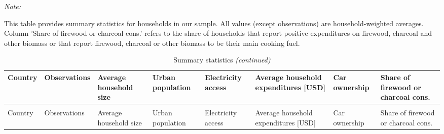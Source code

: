 \begingroup\fontsize{9}{11}\selectfont

\begin{ThreePartTable}
\begin{TableNotes}
\item \textit{Note: } 
\item This table provides summary statistics for households in our sample. All values (except observations) are household-weighted averages. Column 'Share of firewood or charcoal cons.' refers to the share of households that report positive expenditures on firewood, charcoal and other biomass or that report firewood, charcoal or other biomass to be their main cooking fuel.
\end{TableNotes}
\begin{longtable}[t]{>{\raggedright\arraybackslash}p{1.5 cm}|>{\raggedleft\arraybackslash}p{1.5 cm}>{\centering\arraybackslash}p{1.5 cm}>{\centering\arraybackslash}p{1.5 cm}>{\centering\arraybackslash}p{1.5 cm}>{\centering\arraybackslash}p{1.5 cm}>{\centering\arraybackslash}p{1.5 cm}>{\centering\arraybackslash}p{1.5 cm}}
\caption{\label{tab:A1}Summary statistics}\\
\toprule
Country & Observations & Average 
household size & Urban 
population & Electricity 
access & Average 
household 
expenditures [USD] & Car 
ownership & Share of 
firewood or 
 charcoal cons.\\
\midrule
\endfirsthead
\caption[]{Summary statistics \textit{(continued)}}\\
\toprule
Country & Observations & Average 
household size & Urban 
population & Electricity 
access & Average 
household 
expenditures [USD] & Car 
ownership & Share of 
firewood or 
 charcoal cons.\\
\midrule
\endhead


\end{longtable}
\end{ThreePartTable}
